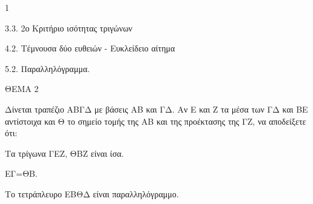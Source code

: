 \begin{ylh}{1}
    \item 3.3. 2ο Κριτήριο ισότητας τριγώνων
    \item 4.2. Τέμνουσα δύο ευθειών - Ευκλείδειο αίτημα
    \item 5.2. Παραλληλόγραμμα.
\end{ylh}

ΘΕΜΑ 2

Δίνεται τραπέζιο ΑΒΓΔ με βάσεις ΑΒ και ΓΔ. Αν Ε και Ζ τα μέσα των ΓΔ και ΒΕ αντίστοιχα και Θ το σημείο τομής της ΑΒ και της προέκτασης της ΓΖ, να αποδείξετε ότι:

\begin{alist}
\item Τα τρίγωνα ΓΕΖ, ΘΒΖ είναι ίσα. 

\item ΕΓ=ΘΒ. 

\item Το τετράπλευρο ΕΒΘΔ είναι παραλληλόγραμμο. 


\begin{center}
\end{center}
\end{alist}
